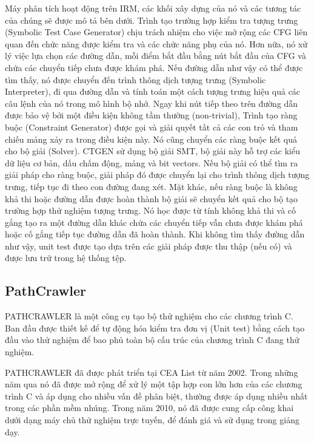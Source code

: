 \documentclass[12pt,a4paper]{article}
\begin{document}
\indent Máy phân tích hoạt động trên IRM, các khối xây dựng của nó và các tương tác của chúng sẽ được mô tả bên dưới. Trình tạo trường hợp kiểm tra tượng trưng (Symbolic Test Case Generator) chịu trách nhiệm cho việc mở rộng các CFG liên quan đến chức năng được kiểm tra và các chức năng phụ của nó. Hơn nữa, nó xử lý việc lựa chọn các đường dẫn, mỗi điểm bắt đầu bằng nút bắt đầu của CFG và chứa các chuyển tiếp chưa được khám phá. Nếu đường dẫn như vậy có thể được tìm thấy, nó được chuyển đến trình thông dịch tượng trưng (Symbolic Interpreter), đi qua đường dẫn và tính toán một cách tượng trưng hiệu quả các câu lệnh của nó trong mô hình bộ nhớ. Ngay khi nút tiếp theo trên đường dẫn được bảo vệ bởi một điều kiện không tầm thường (non-trivial), Trình tạo ràng buộc (Constraint Generator) được gọi và giải quyết tất cả các con trỏ và tham chiếu mảng xảy ra trong điều kiện này. Nó cũng chuyển các ràng buộc kết quả cho bộ giải (Solver). CTGEN sử dụng bộ giải SMT, bộ giải này hỗ trợ các kiểu dữ liệu cơ bản, dấu chấm động, mảng và bit vectors. Nếu bộ giải có thể tìm ra giải pháp cho ràng buộc, giải pháp đó được chuyển lại cho trình thông dịch tượng trưng, tiếp tục đi theo con đường đang xét. Mặt khác, nếu ràng buộc là không khả thi hoặc đường dẫn được hoàn thành bộ giải sẽ chuyển kết quả cho bộ tạo trường hợp thử nghiệm tượng trưng. Nó học được từ tính không khả thi và cố gắng tạo ra một đường dẫn khác chứa các chuyển tiếp vẫn chưa được khám phá hoặc cố gắng tiếp tục đường dẫn đã hoàn thành. Khi không tìm thấy đường dẫn như vậy, unit test được tạo dựa trên các giải pháp được thu thập (nếu có) và được lưu trữ trong hệ thống tệp. 
\subsection{PathCrawler}
PATHCRAWLER là một công cụ tạo bộ thử nghiệm cho các chương trình C. Ban đầu được thiết kế để tự động hóa  kiểm tra đơn vị (Unit test) bằng cách tạo đầu vào thử nghiệm để bao phủ toàn bộ cấu trúc của chương trình C đang thử nghiệm.

\indent PATHCRAWLER đã được phát triển tại CEA List từ năm 2002. Trong những năm qua nó đã được mở rộng để xử lý một tập hợp con lớn hơn của các chương trình C và áp dụng cho nhiều vấn đề phân biệt, thường được áp dụng nhiều nhất trong các phần mềm nhúng. Trong năm 2010, nó đã được cung cấp công khai dưới dạng máy chủ thử nghiệm trực tuyến, để đánh giá và sử dụng trong giảng dạy.
\end{document}
